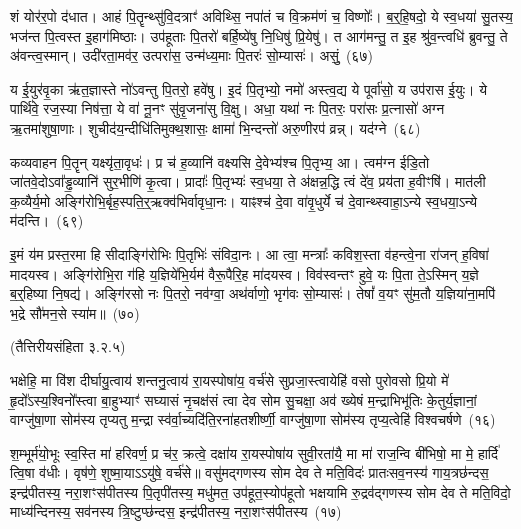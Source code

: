 शं योर॑र॒पो द॑धात। आहं पि॒तॄन्थ्सु॑वि॒दत्राꣳ॑ अविथ्सि॒ नपा॑तं च वि॒क्रम॑णं च॒ विष्णोः᳚। ब॒र्॒\mbox{}हि॒षदो॒ ये स्व॒धया॑ सु॒तस्य॒ भज॑न्त पि॒त्वस्त इ॒हाग॑मिष्ठाः। उप॑हूताः पि॒तरो॑ बर्\mbox{}हि॒ष्ये॑षु नि॒धिषु॑ प्रि॒येषु॑। त आग॑मन्तु॒ त इ॒ह श्रु॑व॒न्त्वधि॑ ब्रुवन्तु॒ ते अ॑वन्त्व॒स्मान्। उदी॑रता॒मव॑र॒ उत्परा॑स॒ उन्म॑ध्य॒माः पि॒तरः॑ सो॒म्यासः॑। असुं॒~(६७)

य ई॒युर॑वृ॒का ऋ॑त॒ज्ञास्ते नो॑\-ऽवन्तु पि॒तरो॒ हवे॑षु। इ॒दं पि॒तृभ्यो॒ नमो॑ अस्त्व॒द्य ये पूर्वा॑सो॒ य उप॑रास ई॒युः। ये पार्थि॑वे॒ रज॒स्या निष॑त्ता॒ ये वा॑ नू॒नꣳ सु॑वृ॒जना॑सु वि॒क्षु। अधा॒ यथा॑ नः पि॒तरः॒ परा॑सः प्र॒त्नासो॑ अग्न ऋ॒तमा॑शुषा॒णाः। शुचीद॑य॒न्दीधि॑तिमुक्थ॒शासः॒ क्षामा॑ भि॒न्दन्तो॑ अरु॒णीरप॑ व्रन्न्। यद॑ग्ने~(६८)

कव्यवाहन पि॒तॄन् यक्ष्यृ॑ता॒वृधः॑। प्र च॑ ह॒व्यानि॑ वक्ष्यसि दे॒वेभ्य॑श्च पि॒तृभ्य॒ आ। त्वम॑ग्न ईडि॒तो जा॑तवे॒दो\-ऽवा᳚ड्ढ॒व्यानि॑ सुर॒भीणि॑ कृ॒त्वा। प्रादाः᳚ पि॒तृभ्यः॑ स्व॒धया॒ ते अ॑क्षन्न॒द्धि त्वं दे॑व॒ प्रय॑ता ह॒वीꣳषि॑। मात॑ली क॒व्यैर्य॒मो अङ्गि॑रोभि॒र्बृह॒स्पति॒र्॒\mbox{}ऋक्व॑भिर्वावृधा॒नः। याꣴश्च॑ दे॒वा वा॑वृ॒धुर्ये च॑ दे॒वान्थ्\-स्वाहा॒ऽन्ये स्व॒धया॒ऽन्ये म॑दन्ति।~(६९)

इ॒मं य॑म प्रस्त॒रमा हि सीदाङ्गि॑रोभिः पि॒तृभिः॑ संविदा॒नः। आ त्वा॒ मन्त्राः᳚ कविश॒स्ता व॑हन्त्वे॒ना रा॑जन् ह॒विषा॑ मादयस्व। अङ्गि॑रोभि॒रा ग॑हि य॒ज्ञिये॑भि॒र्यम॑ वैरू॒पैरि॒ह मा॑दयस्व। विव॑स्वन्तꣳ हुवे॒ यः पि॒ता ते॒\-ऽस्मिन् य॒ज्ञे ब॒र्॒\mbox{}हिष्या नि॒षद्य॑। अङ्गि॑रसो नः पि॒तरो॒ नव॑ग्वा॒ अथ॑र्वाणो॒ भृग॑वः सो॒म्यासः॑। तेषां᳚ व॒यꣳ सु॑म॒तौ य॒ज्ञिया॑ना॒मपि॑ भ॒द्रे सौ॑मन॒से स्या॑म॥~(७०)


\centerline{\scriptsize (तैत्तिरीयसंहिता ३.२.५)}

भक्षेहि॒ मा वि॑श दीर्घायु॒त्वाय॑ शन्तनु॒त्वाय॑ रा॒यस्पोषा॑य॒ वर्च॑से सुप्रजा॒स्त्वायेहि॑ वसो पुरोवसो प्रि॒यो मे॑ हृ॒दो᳚\-ऽस्य॒श्विनो᳚स्त्वा बा॒हुभ्याꣳ॑ सघ्यासं नृ॒चक्ष॑सं त्वा देव सोम सु॒चक्षा॒ अव॑ ख्येषं म॒न्द्राभिभू॑तिः के॒तुर्य॒ज्ञानां॒ वाग्जु॑षा॒णा सोम॑स्य तृप्यतु म॒न्द्रा स्व॑र्वा॒च्यदि॑ति॒रना॑हतशीर्ष्णी॒ वाग्जु॑षा॒णा सोम॑स्य तृप्य॒त्वेहि॑ विश्वचर्\mbox{}षणे~(१६)

श॒म्भूर्म॑यो॒भूः स्व॒स्ति मा॑ हरिवर्ण॒ प्र च॑र॒ क्रत्वे॒ दक्षा॑य रा॒यस्पोषा॑य सुवी॒रता॑यै॒ मा मा॑ राज॒न्वि बी॑भिषो॒ मा मे॒ हार्दि॑ त्वि॒षा व॑धीः। वृष॑णे॒ शुष्मा॒याऽऽयु॑षे॒ वर्च॑से॥ वसु॑मद्गणस्य सोम देव ते मति॒विदः॑ प्रातःसव॒नस्य॑ गाय॒त्रछ॑न्दस॒ इन्द्र॑पीतस्य॒ नरा॒शꣳस॑पीतस्य पि॒तृपी॑तस्य॒ मधु॑मत॒ उप॑हूत॒स्योप॑हूतो भक्षयामि रु॒द्रव॑द्गणस्य सोम देव ते मति॒विदो॒ माध्य॑न्दिनस्य॒ सव॑नस्य त्रि॒ष्टुप्छ॑न्दस॒ इन्द्र॑पीतस्य॒ नरा॒शꣳस॑पीतस्य~(१७)

